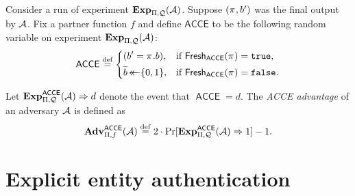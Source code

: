 \begin{definition}\label{def:security:acce}
Consider a run of experiment $\mathbf{Exp}_{\mathrm{\Pi},\mathcal{Q}}^{}(\mathcal{A})$.
Suppose $(\oracle, b')$ was the final output by $\mathcal{A}$. 
Fix a partner function $f$ and define $\mathsf{ACCE}$ to be the following random variable on experiment $\mathbf{Exp}_{\mathrm{\Pi},\mathcal{Q}}^{}(\mathcal{A})$:
\begin{equation}
\acce \defeq
	\begin{dcases}
		(b' = \oracle.b), & \text{if } \fresh_{\acce}(\oracle) = \TRUE, \\
		\widetilde{b} \getsr \bits, & \text{if } \fresh_{\acce}(\oracle) = \FALSE. 
	\end{dcases} 
\end{equation}

Let $\mathbf{Exp}_{\mathrm{\Pi},\mathcal{Q}}^{\mathsf{ACCE}}(\mathcal{A}) \Rightarrow d$ denote the event that $\operatorname{\mathsf{ACCE}} = d$.
The \emph{ACCE advantage} of an adversary $\mathcal{A}$ is defined as
\begin{equation}
	\mathbf{Adv}_{\mathrm{\Pi},f}^{\mathsf{ACCE}}(\mathcal{A}) \overset{\mathrm{def}}{=}  2\cdot \Pr[\mathbf{Exp}_{\mathrm{\Pi},\mathcal{Q}}^{\mathsf{ACCE}}(\mathcal{A}) \Rightarrow 1] - 1   .
\end{equation}
\end{definition}













\section{Explicit entity authentication}\label{sec:definitions:EA}

